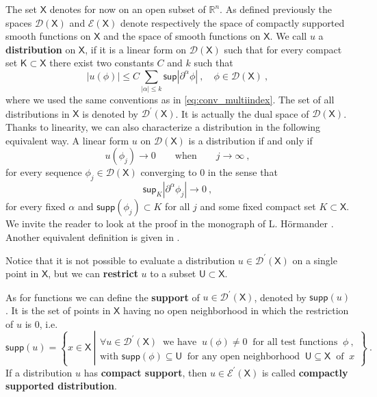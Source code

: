 \documentclass[11pt]{book}
\newcommand{\supp}{\mathsf{supp}}
\renewcommand{\sup}{\mathsf{sup}}
\newcommand{\abs}[1]{\left|#1\right|}
\newcommand{\Dcal}{\mathcal{D}}
\newcommand{\Ecal}{\mathcal{E}}
\newcommand{\Rbb}{\mathbb{R}}
\newcommand{\Ksf}{\mathsf{K}}
\newcommand{\Usf}{\mathsf{U}}
\newcommand{\Xsf}{\mathsf{X}}
\theoremstyle{break}
\begin{document}
The set $\Xsf$ denotes for now on an open subset of $\Rbb^n$. As defined previously the spaces $\Dcal(\Xsf)$ and $\Ecal(\Xsf)$ denote respectively the space of compactly supported smooth functions on $\Xsf$ and the space of smooth functions on $\Xsf$. We call $u$ a \textbf{distribution} on $\Xsf$, if it is a linear form on $\Dcal(\Xsf)$ such that for every compact set $\Ksf \subset \Xsf$ there exist two constants $C$ and $k$ such that
%
\begin{equation*}
\abs{u(\phi)} \leq C \sum_{\abs{\alpha} \leq k} \sup \abs{\partial^\alpha \phi} \ , \quad \phi \in \Dcal(\Xsf) \ ,
\end{equation*}
%
where we used the same conventions as in \eqref{eq:conv_multiindex}. The set of all distributions in $\Xsf$ is denoted by $\Dcal^\prime(\Xsf)$. It is actually the dual space of $\Dcal(\Xsf)$. Thanks to linearity, we can also characterize a distribution in the following equivalent way. A linear form $u$ on $\Dcal(\Xsf)$ is a distribution if and only if 
%
\begin{equation*}
u(\phi_j) \to 0 \qquad  \mbox{when} \qquad j \to \infty \ ,
\end{equation*}
%
for every sequence $\phi_j \in \Dcal(\Xsf)$ converging to $0$ in the sense that
%
\begin{equation*}
\sup_{K}\abs{\partial^\alpha\phi_j} \to 0 \ ,
\end{equation*}
%
for every fixed $\alpha$ and $\supp(\phi_j) \subset K$ for all $j$ and some fixed compact set $K \subset \Xsf$. We invite the reader to look at the proof in the monograph of L. Hörmander \cite[theorem 2.4]{HORMANDER_1990}. Another equivalent definition is given in \cite[theorem 2.15]{HORMANDER_1990}.


Notice that it is not possible to evaluate a distribution $u \in \Dcal^\prime(\Xsf)$ on a single point in $\Xsf$, but we can \textbf{restrict} $u$ to a subset $\Usf \subset \Xsf$. 


As for functions we can define the \textbf{support} of $u \in \Dcal^\prime(\Xsf)$, denoted by $\supp(u)$. It is the set of points in $\Xsf$ having no open neighborhood in which the restriction of $u$ is $0$, i.e. 
%
\begin{equation}
\supp(u) = \left\{ x \in \Xsf \ \left|
\begin{array}{l}
\forall u \in \Dcal^\prime(\Xsf) \ \mbox{ we have } \ u(\phi) \neq 0 \ \mbox{ for all test functions } \ \phi \ , \\ 
\mbox{with } \supp(\phi) \subseteq \Usf \ \mbox{ for any open neighborhood } \ \Usf \subseteq \Xsf \ \mbox{ of } \ x 
\end{array}
\right. \right\} \ .
\label{eq:supp_distribution}
\end{equation}
%
If a distribution $u$ has \textbf{compact support}, then $u \in \Ecal^\prime(\Xsf)$ is called \textbf{compactly supported distribution}. 
\end{document}
